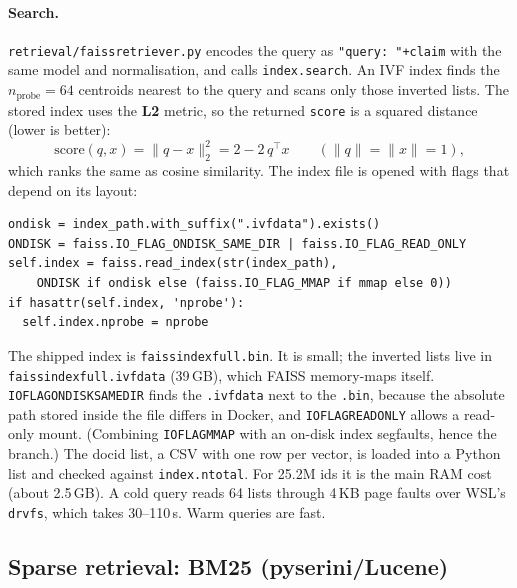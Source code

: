 \documentclass[11pt,a4paper]{article}
\makeatletter
\DeclareRobustCommand{\_}{\ifmmode\nfss@text{\textunderscore}\else\textunderscore\allowbreak\fi}
\newcommand{\file}[1]{\texttt{#1}}
\makeatother
\begin{document}
\paragraph{Search.} \file{retrieval/faiss\_retriever.py} encodes the query as \texttt{"query: "+claim} with the same
model and normalisation, and calls \texttt{index.search}. An IVF index finds the $n_\text{probe}=64$ centroids nearest
to the query and scans only those inverted lists. The stored index uses the \textbf{L2} metric, so the returned
\texttt{score} is a squared distance (lower is better):
\[
  \mathrm{score}(q,x) = \lVert q - x\rVert_2^2 = 2 - 2\,q^\top x \qquad (\lVert q\rVert=\lVert x\rVert=1),
\]
which ranks the same as cosine similarity. The index file is opened with flags that depend on its layout:

\begin{lstlisting}
ondisk = index_path.with_suffix(".ivfdata").exists()
ONDISK = faiss.IO_FLAG_ONDISK_SAME_DIR | faiss.IO_FLAG_READ_ONLY
self.index = faiss.read_index(str(index_path),
    ONDISK if ondisk else (faiss.IO_FLAG_MMAP if mmap else 0))
if hasattr(self.index, 'nprobe'):
  self.index.nprobe = nprobe
\end{lstlisting}

The shipped index is \file{faiss\_index\_full.bin}. It is small; the inverted lists live in
\file{faiss\_index\_full.ivfdata} (39\,GB), which FAISS memory-maps itself. \texttt{IO\_FLAG\_ONDISK\_SAME\_DIR}
finds the \texttt{.ivfdata} next to the \texttt{.bin}, because the absolute path stored inside the file differs in
Docker, and \texttt{IO\_FLAG\_READ\_ONLY} allows a read-only mount. (Combining \texttt{IO\_FLAG\_MMAP} with an on-disk
index segfaults, hence the branch.) The docid list, a CSV with one row per vector, is loaded into a Python list and
checked against \texttt{index.ntotal}. For 25.2M ids it is the main RAM cost (about 2.5\,GB). A cold query reads
64 lists through 4\,KB page faults over WSL's \texttt{drvfs}, which takes 30--110\,s. Warm queries are fast.

\subsection{Sparse retrieval: BM25 (pyserini/Lucene)}
\end{document}
